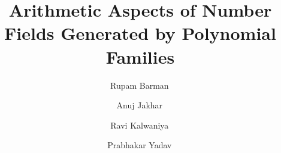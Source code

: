 \documentclass[table]{amsart}
\numberwithin{equation}{section}
\begin{document}
\title[monogeneity and Galois group] {Arithmetic Aspects of Number Fields Generated by Polynomial Families}
\author[Rupam Barman]{Rupam Barman\, }
\address[Barman]{Department of Mathematics, Indian Institute of Technology Guwahati, Assam, India,
PIN- 781039}
\author[A. Jakhar]{Anuj Jakhar\, }
\address[Jakhar, Kalwaniya]{Department of Mathematics, Indian Institute of Technology Madras, Chennai-600036, Tamil Nadu, India}

\author[R.~Kalwaniya]{Ravi Kalwaniya\, }

\author[P.~Yadav]{Prabhakar Yadav\, }
\address[Yadav]{Department of Computer Science, Ashoka University, Sonipat-131021, Haryana, India}
\end{document}
